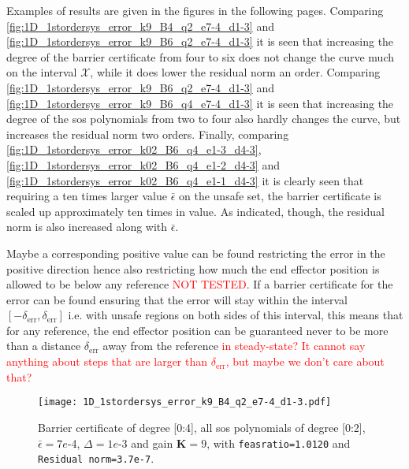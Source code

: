 Examples of results are given in the figures in the following pages. Comparing \autoref{fig:1D_1stordersys_error_k9_B4_q2_e7-4_d1-3} and \ref{fig:1D_1stordersys_error_k9_B6_q2_e7-4_d1-3} it is seen that increasing the degree of the barrier certificate from four to six does not change the curve much on the interval $\mathcal{X}$, while it does lower the residual norm an order. Comparing \autoref{fig:1D_1stordersys_error_k9_B6_q2_e7-4_d1-3} 
and \ref{fig:1D_1stordersys_error_k9_B6_q4_e7-4_d1-3} it is seen that increasing the degree of the \gls{sos} polynomials from two to four also hardly changes the curve, but increases the residual norm two orders. Finally, comparing \autoref{fig:1D_1stordersys_error_k02_B6_q4_e1-3_d4-3}, \ref{fig:1D_1stordersys_error_k02_B6_q4_e1-2_d4-3} and \ref{fig:1D_1stordersys_error_k02_B6_q4_e1-1_d4-3} it is clearly seen that requiring a ten times larger value  $\bar{\epsilon}$ on the unsafe set, the barrier certificate is scaled up approximately ten times in value. As indicated, though, the residual norm is also increased along with $\bar{\epsilon}$.

Maybe a corresponding positive value can be found restricting the error in the positive direction hence also restricting how much the end effector position is allowed to be below any reference \textcolor{red}{NOT TESTED}. If a barrier certificate for the error can be found ensuring that the error will stay within the interval $[-\delta_\text{err},\delta_\text{err}]$ i.e. with unsafe regions on both sides of this interval, this means that for any reference, the end effector position can be guaranteed never to be more than a distance $\delta_\text{err}$ away from the reference \textcolor{red}{in steady-state? It cannot say anything about steps that are larger than $\delta_\text{err}$, but maybe we don't care about that?}




\begin{figure}[htbp]
\centering
\texttt{[image: 1D\_1stordersys\_error\_k9\_B4\_q2\_e7-4\_d1-3.pdf]}
\caption{Barrier certificate of degree [0:4], all \gls{sos} polynomials of degree [0:2], $\bar{\epsilon}=7e$-4, $\Delta=1e$-3 and gain $\textbf{K}=9$, with \texttt{feasratio=1.0120} and \texttt{Residual norm=3.7e-7}.}
\label{fig:1D_1stordersys_error_k9_B4_q2_e7-4_d1-3}
\end{figure}

